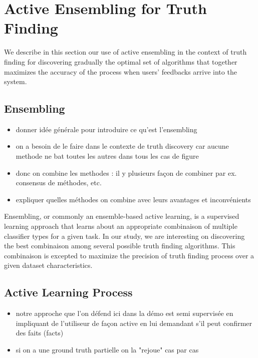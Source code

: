 \section{Active Ensembling for Truth Finding}
We describe in this section our use of active ensembling in the context of truth finding
for discovering gradually the optimal set of algorithms that together maximizes the accuracy
of the process when users' feedbacks arrive into the system.

\subsection{Ensembling }
\begin{itemize}
\item donner idée générale pour introduire  ce qu'est l'ensembling
\item on a besoin de le faire dans le contexte de truth discovery car aucune methode ne bat toutes les autres dans tous les cas de figure
\item donc on combine les methodes : il y plusieurs façon de combiner par ex. consensus de méthodes, etc.
\item expliquer quelles méthodes on combine avec leurs avantages et inconvénients
\end{itemize}


Ensembling, or commonly an ensemble-based active learning, is a supervised learning approach that learns
about an appropriate combinaison of multiple classifier types for a given task. In our study, we are interesting
on discovering the best combinaison among several possible truth finding algorithms. This combinaison is excepted 
to maximize the precision of truth finding process over a given dataset characteristics.


\subsection{Active Learning Process}
\begin{itemize}
 \item notre approche que l'on défend ici dans la démo est  semi supervisée en impliquant de l'utiliseur de façon active
en lui demandant s'il peut confirmer des faits (facts)
\item si on a une ground truth partielle on la "rejoue" cas par cas
\end{itemize}

